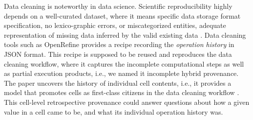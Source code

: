 Data cleaning is noteworthy in data science. Scientific reproducibility highly depends on a well-curated dataset, where it means specific data storage format specification, no lexico-graphic errors, or miscategorized entities, adequate representation of missing data inferred by the valid existing data \cite{nunez2020first}.  Data cleaning tools such as OpenRefine provides a recipe recording the \textit{operation history} in JSON format. This recipe is supposed to be reused and reproduces the data cleaning workflow, where it captures the incomplete computational steps as well as partial execution products, i.e., we named it incomplete hybrid provenance. The paper uncovers the history of individual cell contents, i.e., it provides a model that promotes cells as first-class citizens in the data cleaning workflow \cite{nunez2020first}. This cell-level retrospective provenance could answer questions about how a given value in a cell came to be, and what its individual operation history was. 




